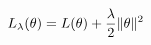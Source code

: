 \documentclass[preview]{standalone}
\begin{document}
\begin{align*}
\special{dvisvgm:raw <g id='unique000'>}L_\lambda(\theta) = L(\theta) + \frac{\lambda}{2}\|\theta\|^2\special{dvisvgm:raw </g>}
\end{align*}
\end{document}
